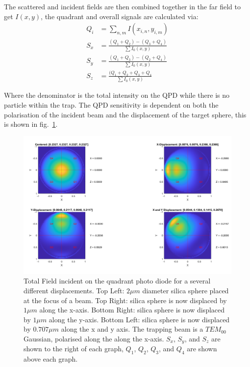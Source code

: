 The scattered and incident fields are then combined together 
in the far field to get $I(x,y)$, the quadrant and overall signals are 
calculated via:
\begin{align}
	Q_i &= \sum_{n,m} I(x_{i,n}, y_{i,m}) \\
	S_{x} &= \frac{(Q_1+Q_2)-(Q_3+Q_4)}{\sum I_0(x,y)} \\
	S_{y} &= \frac{(Q_1+Q_3)-(Q_2+Q_4)}{\sum I_0(x,y)} \\
	S_{z} &= \frac{(Q_1+Q_2+Q_3+Q_4}{\sum I_0(x,y)}
\end{align}

Where the denominator is the total intensity on the QPD while there is 
no particle within the trap. The QPD sensitivity is dependent on both 
the polarisation of the incident beam and the displacement of the target 
sphere, this is shown in fig.~\ref{fig:totalfield}.
\begin{figure}[h!]
	\centering
	\includegraphics[width=\linewidth]{fixed_polarisation.png}
	\captionsetup{margin=0.5cm}
	\caption{Total Field incident on the quadrant photo diode for a several
		different displacements. Top Left: $2\mu m $ diameter silica sphere
		placed at the focus of a  beam. Top Right: silica sphere is now
		displaced by $1 \mu m$ along the x-axis. Bottom Right: silica sphere 
		is now displaced by $1 \mu m$ along the y-axis. Bottom Left: silica 
		sphere is now displaced by $0.707 \mu m$ along the x and y axis. 
		The trapping beam is a $TEM_{00}$ Gaussian, polarised along the 
		along the x-axis. $S_x$, $S_y$, and $S_z$ are shown to the right of 
		each graph, $Q_1$, $Q_2$, $Q_3$, and $Q_4$ are shown above each graph.}
	\label{fig:totalfield}
\end{figure}

